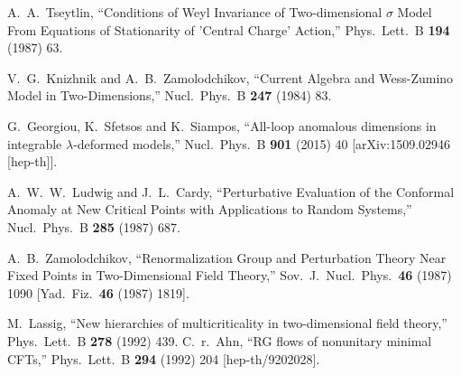 \documentclass[12pt]{article}
\begin{document}
\begin{thebibliography}{99}
{  %
  A.~A.~Tseytlin,
 ``Conditions of Weyl Invariance of Two-dimensional $\sigma$ Model From Equations of Stationarity of 'Central Charge' Action,''
  Phys.\ Lett.\ B {\bf 194} (1987) 63.
  
  
  V.~G.~Knizhnik and A.~B.~Zamolodchikov,
 ``Current Algebra and Wess-Zumino Model in Two-Dimensions,''
  Nucl.\ Phys.\ B {\bf 247} (1984) 83.


  
  
  G.~Georgiou, K.~Sfetsos and K.~Siampos,
   ``All-loop anomalous dimensions in integrable $\lambda$-deformed models,''
  Nucl.\ Phys.\ B {\bf 901} (2015) 40
  [arXiv:1509.02946 [hep-th]].
    
  A.~W.~W.~Ludwig and J.~L.~Cardy,
  ``Perturbative Evaluation of the Conformal Anomaly at New Critical Points with Applications to Random Systems,''
  Nucl.\ Phys.\ B {\bf 285} (1987) 687.
   
   
  A.~B.~Zamolodchikov,
  ``Renormalization Group and Perturbation Theory Near Fixed Points in Two-Dimensional Field Theory,''
  Sov.\ J.\ Nucl.\ Phys.\  {\bf 46} (1987) 1090
   [Yad.\ Fiz.\  {\bf 46} (1987) 1819].

  
  M.~Lassig,
  ``New hierarchies of multicriticality in two-dimensional field theory,''
  Phys.\ Lett.\ B {\bf 278} (1992) 439.
  C.~r.~Ahn,
  ``RG flows of nonunitary minimal CFTs,''
  Phys.\ Lett.\ B {\bf 294} (1992) 204
  [hep-th/9202028].
  
}
\end{thebibliography}
\end{document}
